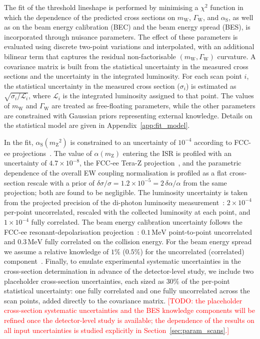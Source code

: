 \documentclass[a4paper,11pt]{article}
\newcommand{\mW}{\ensuremath{m_\mathrm{W}}\xspace}
\newcommand{\mZ}{\ensuremath{m_\mathrm{Z}}\xspace}
\newcommand{\GW}{\ensuremath{\Gamma_\mathrm{W}}\xspace}
\newcommand{\chisq}{\ensuremath{\chi^2}\xspace}
\newcommand{\as}{\ensuremath{\alpha_\mathrm{S}}\xspace}
\newcommand{\asmz}{\ensuremath{\as(\mZ^2)}\xspace}
\newcommand{\MeV}{\ensuremath{\,\mathrm{MeV}}\xspace}
\newcommand{\TODO}[1]{\textcolor{red}{[TODO: #1]}\xspace}
\begin{document}
The fit of the threshold lineshape is performed by minimising a \chisq
function in which the dependence of the predicted cross sections on \mW,
\GW, and \as, as well as on the beam energy calibration (BEC) and the
beam energy spread (BES), is incorporated through nuisance parameters.
The effect of these parameters is evaluated using discrete two-point
variations and interpolated, with an additional bilinear term that
captures the residual non-factorisable $(\mW,\GW)$ curvature. A
covariance matrix is built from the statistical uncertainty in the
measured cross sections and the uncertainty in the integrated
luminosity. For each scan point $i$, the statistical uncertainty in the
measured cross section ($\sigma_i$) is estimated as
$\sqrt{\sigma_i/\mathcal{L}_i}$, where $\mathcal{L}_i$ is the integrated
luminosity assigned to that point. The values of \mW and \GW are treated
as free-floating parameters, while the other parameters are constrained
with Gaussian priors representing external knowledge. Details on the
statistical model are given in Appendix~\ref{app:fit_model}.

In the fit, \asmz is constrained to an uncertainty of $10^{-4}$ according
to FCC-ee projections~\cite{dEnterria:2020cpv}. The value of
$\alpha(\mZ)$ entering the ISR is profiled with an uncertainty of
$4.7\times10^{-8}$, the FCC-ee Tera-Z projection~\cite{Riembau:2025xxx},
and the parametric dependence of the overall EW coupling normalisation is
profiled as a flat cross-section rescale with a prior of
$\delta\sigma/\sigma = 1.2\times 10^{-5} = 2\,\delta\alpha/\alpha$ from
the same projection; both are found to be negligible. The luminosity
uncertainty is taken from the projected precision of the di-photon
luminosity measurement~\cite{CarloniCalame:2019dyk}:
$2\times10^{-4}$ per-point uncorrelated, rescaled with the collected
luminosity at each point, and $1\times10^{-4}$ fully correlated. The
beam energy calibration uncertainty follows the FCC-ee
resonant-depolarisation projection~\cite{FCC:2025lpp,Blondel:2019jmp}:
$0.1\MeV$ point-to-point uncorrelated and $0.3\MeV$ fully correlated on
the collision energy. For the beam energy spread we assume a relative
knowledge of $1\%$ ($0.5\%$) for the uncorrelated (correlated)
component~\cite{Blondel:2019jmp}. Finally, to emulate experimental
systematic uncertainties in the cross-section determination in advance
of the detector-level study, we include two placeholder cross-section
uncertainties, each sized as $30\%$ of the per-point statistical
uncertainty: one fully correlated and one fully uncorrelated across the
scan points, added directly to the covariance matrix.
\TODO{the placeholder cross-section systematic uncertainties and the
BES knowledge components will be refined once the detector-level study
is available; the dependence of the results on all input uncertainties
is studied explicitly in Section~\ref{sec:param_scans}.}
\end{document}

